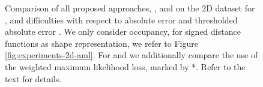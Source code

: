 \begin{figure}
  \caption{Comparison of all proposed approaches, \ML, \AML and \EVAE
  on the 2D dataset for \easy, \moderate and \hard difficulties
  with respect to absolute error \Abs and thresholded absolute error \AbsThr. We
  only consider occupancy, for signed distance functions as shape representation,
  we refer to Figure \ref{fig:experiments-2d-aml}. For \AML
  and \EVAE we additionally compare the use of the weighted maximum likelihood
  loss, marked by *. Refer to the text for details.}
  \label{fig:experiments-2d-ml}
\end{figure}
